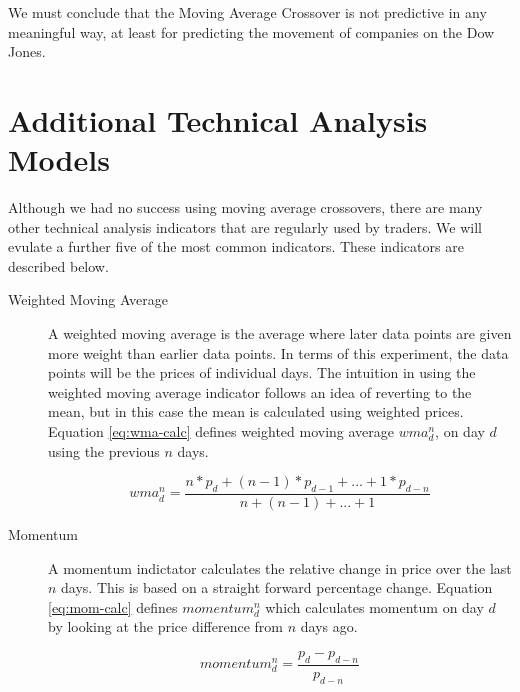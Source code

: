 \documentclass{report}
\begin{document}
We must conclude that the Moving Average Crossover is not predictive in any meaningful way, at least for predicting the movement of companies on the Dow Jones.

\section{Additional Technical Analysis Models}

Although we had no success using moving average crossovers, there are many other technical analysis indicators that are regularly used by traders. We will evulate a further five of the most common indicators. These indicators are described below.

\begin{description}
  \item[Weighted Moving Average] A weighted moving average is the average where later data points are given more weight than earlier data points. In terms of this experiment, the data points will be the prices of individual days. The intuition in using the weighted moving average indicator follows an idea of reverting to the mean, but in this case the mean is calculated using weighted prices. Equation \ref{eq:wma-calc} defines weighted moving average  $wma^{n}_{d}$, on day $d$ using the previous $n$ days.
 
  \begin{figure}[H]
  \begin{center}
      \begin{equation}
        wma^{n}_{d} = \dfrac{n * p_{d} + (n - 1) * p_{d-1} + ... + 1 * p_{d-n}} {n + (n - 1) + ... + 1}
        \label{eq:wma-calc}
      \end{equation}
  \end{center}
  \end{figure} 
    
  \item[Momentum]
  A momentum indictator calculates the relative change in price over the last $n$ days. This is based on a straight forward percentage change. Equation \ref{eq:mom-calc} defines $momentum^{n}_{d}$ which calculates momentum on day $d$ by looking at the price difference from $n$ days ago.
  
  \begin{figure}[H]
  \begin{center}
      \begin{equation}
        momentum^{n}_{d} = \dfrac{p_{d} - p_{d-n}} {p_{d-n}}
        \label{eq:mom-calc}
      \end{equation}
  \end{center}
  \end{figure}  
    

\end{description}
\end{document}
